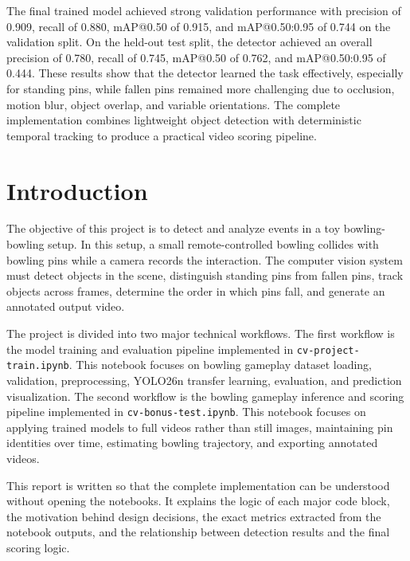 \documentclass[12pt,a4paper]{article}
\begin{document}
The final trained model achieved strong validation performance with precision of 0.909, recall of 0.880, mAP@0.50 of 0.915, and mAP@0.50:0.95 of 0.744 on the validation split. On the held-out test split, the detector achieved an overall precision of 0.780, recall of 0.745, mAP@0.50 of 0.762, and mAP@0.50:0.95 of 0.444. These results show that the detector learned the task effectively, especially for standing pins, while fallen pins remained more challenging due to occlusion, motion blur, object overlap, and variable orientations. The complete implementation combines lightweight object detection with deterministic temporal tracking to produce a practical video scoring pipeline.


\section{Introduction}

The objective of this project is to detect and analyze events in a toy bowling-bowling setup. In this setup, a small remote-controlled bowling collides with bowling pins while a camera records the interaction. The computer vision system must detect objects in the scene, distinguish standing pins from fallen pins, track objects across frames, determine the order in which pins fall, and generate an annotated output video.

The project is divided into two major technical workflows. The first workflow is the model training and evaluation pipeline implemented in \texttt{cv-project-train.ipynb}. This notebook focuses on bowling gameplay dataset loading, validation, preprocessing, YOLO26n transfer learning, evaluation, and prediction visualization. The second workflow is the bowling gameplay inference and scoring pipeline implemented in \texttt{cv-bonus-test.ipynb}. This notebook focuses on applying trained models to full videos rather than still images, maintaining pin identities over time, estimating bowling trajectory, and exporting annotated videos.

This report is written so that the complete implementation can be understood without opening the notebooks. It explains the logic of each major code block, the motivation behind design decisions, the exact metrics extracted from the notebook outputs, and the relationship between detection results and the final scoring logic.
\end{document}
